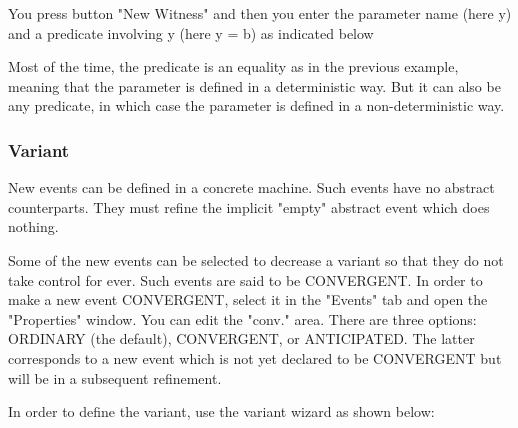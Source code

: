 
You press button "New Witness" and then you enter the parameter name (here y) and a predicate involving y (here y = b) as indicated below


Most of the time, the predicate is an equality as in the previous example, meaning that the parameter is defined in a deterministic way. But it can also be any predicate, in which case the parameter is defined in a non-deterministic way. 

\subsubsection{Variant}

New events can be defined in a concrete machine. Such events have no abstract counterparts. They must refine the implicit "empty" abstract event which does nothing.

Some of the new events can be selected to decrease a variant so that they do not take control for ever. Such events are said to be CONVERGENT. In order to make a new event CONVERGENT, select it in the "Events" tab and open the "Properties" window. You can edit the "conv." area. There are three options: ORDINARY (the default), CONVERGENT, or ANTICIPATED. The latter corresponds to a new event which is not yet declared to be CONVERGENT but will be in a subsequent refinement.

In order to define the variant, use the variant wizard as shown below:


